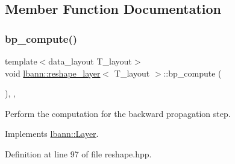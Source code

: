 \subsection{Member Function Documentation}
\mbox{\label{classlbann_1_1reshape__layer_a31d90673a9d98ccba0eafb4bf76cbe20}} 
\subsubsection{\texorpdfstring{bp\+\_\+compute()}{bp\_compute()}}
{\footnotesize\ttfamily template$<$data\+\_\+layout T\+\_\+layout$>$ \\
void \hyperlink{classlbann_1_1reshape__layer}{lbann\+::reshape\+\_\+layer}$<$ T\+\_\+layout $>$\+::bp\+\_\+compute (\begin{DoxyParamCaption}{ }\end{DoxyParamCaption})\hspace{0.3cm}{\ttfamily [inline]}, {\ttfamily [override]}, {\ttfamily [virtual]}}

Perform the computation for the backward propagation step. 

Implements \hyperlink{classlbann_1_1Layer_a7442e01f9ee1294df2de811efcf5171e}{lbann\+::\+Layer}.



Definition at line 97 of file reshape.\+hpp.


